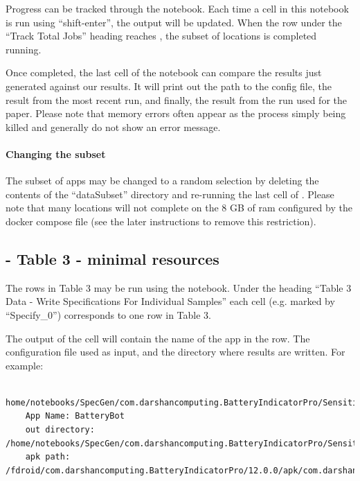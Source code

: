 \documentclass{acmart} %
\begin{document}
Progress can be tracked through the  notebook.  
Each time a cell in this notebook is run using ``shift-enter'', the output will be updated.
When the  row under the ``Track Total Jobs'' heading reaches \numsubset, the subset of locations is completed running.

Once completed, the last cell of the notebook  can compare the results just generated against our results.  It will print out the path to the config file, the result from the most recent run, and finally, the result from the run used for the paper.  Please note that memory errors often appear as the process simply being killed and generally do not show an error message.

\paragraph{Changing the subset} The subset of apps may be changed to a random selection by deleting the contents of the ``dataSubset'' directory and re-running the last cell of .  Please note that many locations will not complete on the 8 GB of ram configured by the docker compose file (see the later instructions to remove this restriction).  


\subsection{ - Table 3 - minimal resources}

The rows in Table 3 may be run using the  notebook.
Under the heading ``Table 3 Data - Write Specifications For Individual Samples'' each cell (e.g. marked by ``Specify\_0'') corresponds to one row in Table 3.

The output of the cell will contain the name of the app in the row. The configuration file used as input, and the directory where results are written.  For example:

\begin{lstlisting}
    home/notebooks/SpecGen/com.darshancomputing.BatteryIndicatorPro/SensitiveDerefCallinCaused/0/config.json
    App Name: BatteryBot
    out directory: /home/notebooks/SpecGen/com.darshancomputing.BatteryIndicatorPro/SensitiveDerefCallinCaused/0
    apk path: /fdroid/com.darshancomputing.BatteryIndicatorPro/12.0.0/apk/com.darshancomputing.BatteryIndicatorPro\_26016.apk
\end{lstlisting}
\end{document}
